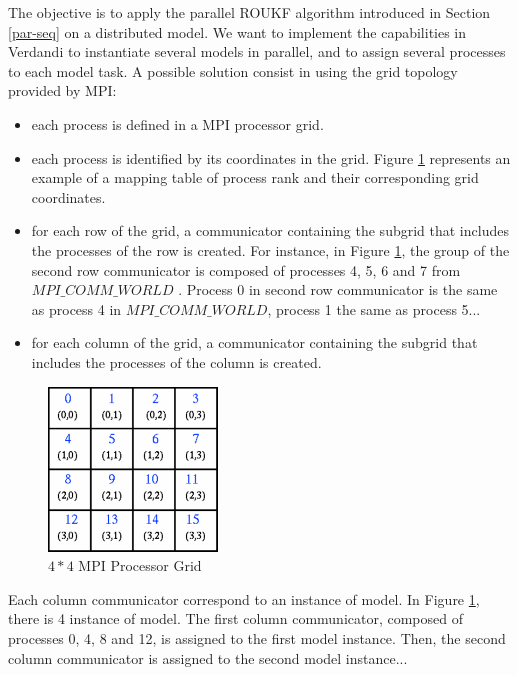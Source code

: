The objective is to apply the parallel ROUKF algorithm introduced in Section \ref{par-seq} on  a distributed model. We want to implement the capabilities in Verdandi to instantiate several models in parallel, and to assign several processes to each model task. A possible solution consist in using the grid topology provided by MPI:


\begin{itemize}

\item each process is defined in a MPI processor grid.

\item each process is identified by its coordinates in the grid. Figure \ref{fig:mpi_grid} represents an example of a mapping table of process rank and their corresponding grid coordinates.

\item  for each row of the grid,  a communicator containing the subgrid that includes the processes of the row is created. For instance,  in Figure \ref{fig:mpi_grid}, the group of the second row communicator is composed of processes 4, 5, 6 and 7 from $MPI\_COMM\_WORLD$ . Process 0 in second row communicator is the same as process 4 in $MPI\_COMM\_WORLD$, process 1 the same as process 5...

\item for each column of the grid,  a communicator containing the subgrid that includes the processes of the column is created.

\end{itemize}

\begin{figure}
  \caption{$4*4$ MPI Processor Grid }
  \label{fig:mpi_grid}
  \centering\includegraphics[width=0.4\textwidth]{figure/grid.pdf}

\end{figure}



Each column communicator correspond to an instance of model. In Figure \ref{fig:mpi_grid}, there is 4 instance of model. The first column communicator, composed of processes 0, 4, 8 and 12, is assigned to the first model instance. Then, the second column communicator is assigned to the second model instance...

